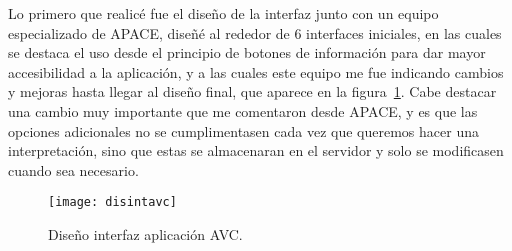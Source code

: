 Lo primero que realicé fue el diseño de la interfaz junto con un equipo especializado de APACE, diseñé al rededor de 6 interfaces iniciales, en las cuales se destaca el uso desde el principio de botones de información para dar mayor accesibilidad a la aplicación, y a las cuales este equipo me fue indicando cambios y mejoras hasta llegar al diseño final, que aparece en la figura~\ref{fig:dinteravc}. Cabe destacar una cambio muy importante que me comentaron desde APACE, y es que las opciones adicionales no se cumplimentasen cada vez que queremos hacer una interpretación, sino que estas se almacenaran en el servidor y solo se modificasen cuando sea necesario.

\begin{figure}
	\centering
	\texttt{[image: disintavc]}
	\caption{Diseño interfaz aplicación AVC.}
	\label{fig:dinteravc}
\end{figure}

